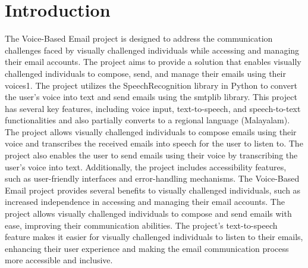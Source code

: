 \documentclass[12pt]{report}
\begin{document}
\chapter{Introduction}
\setcounter{page}{1}
The Voice-Based Email project is designed to address the communication challenges faced by visually challenged individuals while accessing and managing their email accounts. The project aims to provide a solution that enables visually challenged individuals to compose, send, and manage their emails using their voices1. The project utilizes the SpeechRecognition library in Python to convert the user's voice into text and send emails using the smtplib library. \newline \newline
This project has several key features, including voice input, text-to-speech, and speech-to-text functionalities and also partially converts to a regional language (Malayalam). The project allows visually challenged individuals to compose emails using their voice and transcribes the received emails into speech for the user to listen to. The project also enables the user to send emails using their voice by transcribing the user's voice into text. Additionally, the project includes accessibility features, such as user-friendly interfaces and error-handling mechanisms.\newline \newline
The Voice-Based Email project provides several benefits to visually challenged individuals, such as increased independence in accessing and managing their email accounts. The project allows visually challenged individuals to compose and send emails with ease, improving their communication abilities. The project's text-to-speech feature makes it easier for visually challenged individuals to listen to their emails, enhancing their user experience and making the email communication process more accessible and inclusive.
 \newline \newline
\end{document}
